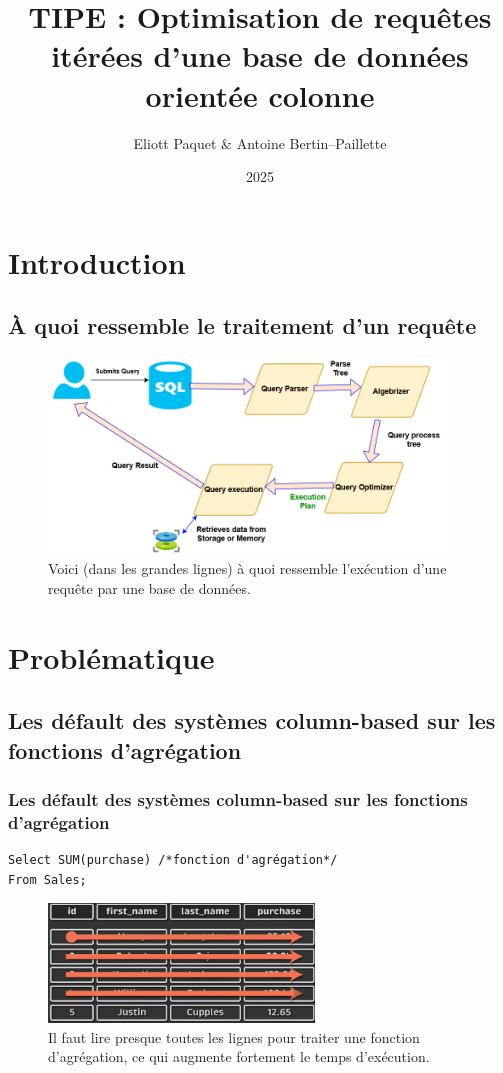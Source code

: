\documentclass[a4paper,12pt]{beamer}
\title{TIPE : Optimisation de requêtes itérées d'une base de données orientée colonne}
\author[Eliott P \& Antoine BP]{Eliott Paquet \& Antoine Bertin--Paillette}
\date{2025}
\begin{document}
\begin{frame}
	\titlepage
\end{frame}

\section{Introduction}
\subsection{À quoi ressemble le traitement d'un requête}
\begin{frame}
	\begin{figure}[h]
		\centering
		\includegraphics[width=300pt]{ressource/query_map.png}
    \caption{Voici (dans les grandes lignes) à quoi ressemble l'exécution d'une requête par une base de données.}
	\end{figure}
\end{frame}


\section{Problématique}
\subsection{Les défault des systèmes column-based sur les fonctions d'agrégation}
\begin{frame}[containsverbatim]
    \frametitle{Les défault des systèmes column-based sur les fonctions d'agrégation}
\begin{lstlisting}
Select SUM(purchase) /*fonction d'agrégation*/
From Sales;
\end{lstlisting}
    \begin{figure}[h]
		\centering
		\includegraphics[width=200pt]{ressource/exemple_row_sucks.png}
        \caption{\small Il faut lire presque toutes les lignes pour traiter une fonction d'agrégation, ce qui augmente fortement le temps d'exécution.}
	\end{figure}

\end{frame}
\end{document}
